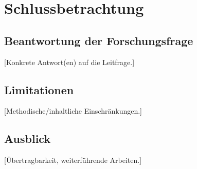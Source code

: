 \chapter{Schlussbetrachtung}

\section{Beantwortung der Forschungsfrage}
[Konkrete Antwort(en) auf die Leitfrage.]

\section{Limitationen}
[Methodische/inhaltliche Einschränkungen.]

\section{Ausblick}
[Übertragbarkeit, weiterführende Arbeiten.]
